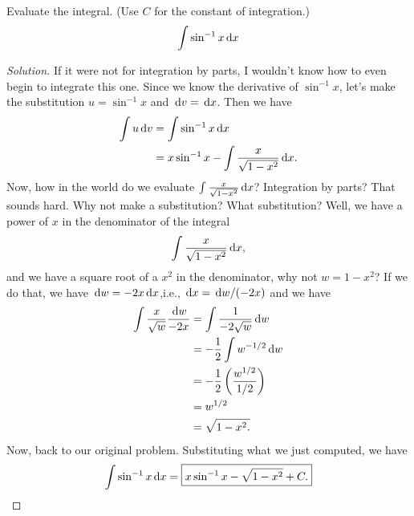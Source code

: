 \begin{problem}[WebAssign HW 9, 4]
Evaluate the integral. (Use $C$ for the constant of integration.)
\[
\int\sin^{-1}x\,\mathrm{d} x
\]
\end{problem}
\begin{proof}[Solution]
If it were not for integration by parts, I wouldn't know how to even begin
to integrate this one. Since we know the derivative of $\sin^{-1}x$, let's
make the substitution $u=\sin^{-1}x$ and $\,\mathrm{d} v=\,\mathrm{d} x$. Then we have
\begin{align*}
\int u\,\mathrm{d} v&=\int \sin^{-1}x\,\mathrm{d} x\\
             &=x\sin^{-1}x-\int\frac{x}{\sqrt{1-x^2}}\,\mathrm{d} x.
\end{align*}
Now, how in the world do we evaluate $\int\frac{x}{\sqrt{1-x^2}}\,\mathrm{d} x$?
Integration by parts? That sounds hard. Why not make a substitution? What
substitution? Well, we have a power of $x$ in the denominator of the
integral
\[
\int\frac{x}{\sqrt{1-x^2}}\,\mathrm{d} x,
\]
and we have a square root of a $x^2$ in the denominator, why not $w=1-x^2$?
If we do that, we have $\,\mathrm{d} w=-2x\,\mathrm{d} x$,i.e., $\,\mathrm{d} x=\,\mathrm{d} w/(-2x)$
and we have
\begingroup
\allowdisplaybreaks
\begin{align*}
\int\frac{x}{\sqrt{w}}\frac{\,\mathrm{d} w}{-2x}
&=\int\frac{1}{-2\sqrt{w}}\,\mathrm{d} w\\
&=-\frac{1}{2}\int w^{-1/2}\,\mathrm{d} w\\
&=-\frac{1}{2}\left(\frac{w^{1/2}}{1/2}\right)\\
&=w^{1/2}\\
&=\sqrt{1-x^2.}
\end{align*}
\endgroup
Now, back to our original problem. Substituting what we just computed, we
have
\[
\int \sin^{-1}x\,\mathrm{d} x=\boxed{x\sin^{-1}x-\sqrt{1-x^2}+C.}
\]
\end{proof}

